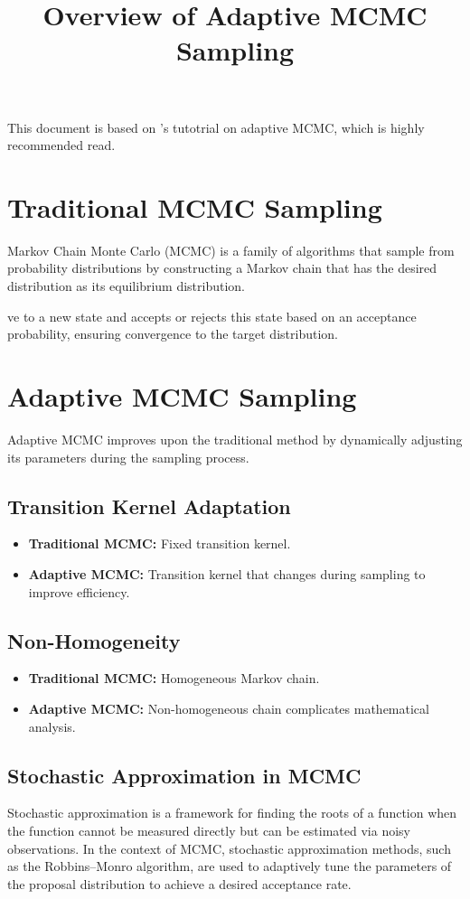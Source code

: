 \documentclass{article}
\title{Overview of Adaptive MCMC Sampling}
\author{}
\date{}
\begin{document}
\maketitle
This document is based on \textcite{andrieu_tutorial_2008} 's tutotrial on adaptive MCMC, which is highly recommended read.
\section{Traditional MCMC Sampling}
Markov Chain Monte Carlo (MCMC) is a family of algorithms that sample from probability distributions by constructing a Markov chain that has the desired distribution as its equilibrium distribution. 

ve to a new state and accepts or rejects this state based on an acceptance probability, ensuring convergence to the target distribution.

\section{Adaptive MCMC Sampling}
Adaptive MCMC improves upon the traditional method by dynamically adjusting its parameters during the sampling process.

\subsection{Transition Kernel Adaptation}
\begin{itemize}
    \item \textbf{Traditional MCMC:} Fixed transition kernel.
    \item \textbf{Adaptive MCMC:} Transition kernel that changes during sampling to improve efficiency.
\end{itemize}

\subsection{Non-Homogeneity}
\begin{itemize}
    \item \textbf{Traditional MCMC:} Homogeneous Markov chain.
    \item \textbf{Adaptive MCMC:} Non-homogeneous chain complicates mathematical analysis.
\end{itemize}

\subsection{Stochastic Approximation in MCMC}
Stochastic approximation is a framework for finding the roots of a function when the function cannot be measured directly but can be estimated via noisy observations. In the context of MCMC, stochastic approximation methods, such as the Robbins–Monro algorithm, are used to adaptively tune the parameters of the proposal distribution to achieve a desired acceptance rate.
\end{document}
